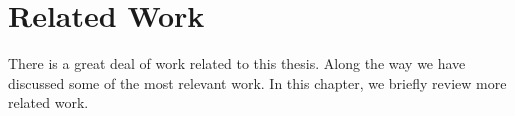 \chapter{Related Work}
\label{chap:related}

There is a great deal of work related to this thesis. Along the way we have
discussed some of the most relevant work. In this chapter, we briefly review
more related work.



